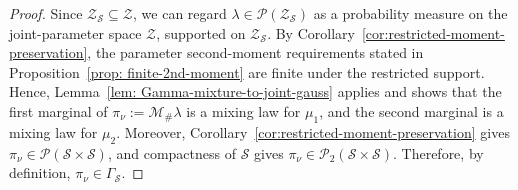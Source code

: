 \documentclass[opre,sglanonrev]{informs4}
\newtheorem{corollary}{Corollary}
\newcommand{\mN}{\mathcal{N}}
\newcommand{\mP}{\mathcal{P}}
\newcommand{\mB}{\mathcal{B}}
\newcommand{\mbR}{\mathbb R}
\newcommand{\mbGM}{\mathbb{GM}}
\newcommand{\bs}{\bm{s}}
\newcommand{\bz}{\bm{z}}
\begin{document}
{\begin{APPENDICES}
\begin{proof}
Since \(\mathcal Z_{\mathcal S}\subseteq\mathcal Z\), we can regard
\(\lambda\in\mathcal P(\mathcal Z_{\mathcal S})\) as a probability measure on
the joint-parameter space \(\mathcal Z\), supported on
\(\mathcal Z_{\mathcal S}\). By Corollary~\ref{cor:restricted-moment-preservation}, the parameter second-moment requirements stated in Proposition~\ref{prop: finite-2nd-moment} are finite under the restricted support. Hence, Lemma~\ref{lem: Gamma-mixture-to-joint-gauss} applies and shows
that the first marginal of \(\pi_\nu:=\mathcal M_{\#}\lambda\) is a mixing law
for \(\mu_1\), and the second marginal is a mixing law for \(\mu_2\).
Moreover, Corollary~\ref{cor:restricted-moment-preservation} gives
\(\pi_\nu\in\mathcal P(\mathcal S\times\mathcal S)\), and compactness of
\(\mathcal S\) gives \(\pi_\nu\in\mathcal P_2(\mathcal S\times\mathcal S)\).
Therefore, by definition, \(\pi_\nu\in\Gamma_{\mathcal S}\).
\end{proof}





\end{APPENDICES}}
\end{document}
